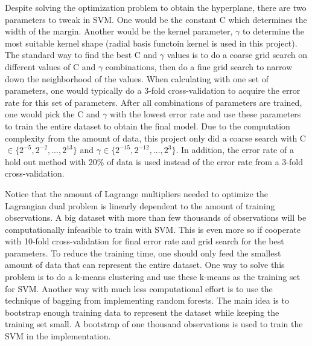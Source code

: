 \documentclass[twoside]{article}
\begin{document}
Despite solving the optimization problem to obtain the hyperplane, there are two parameters to tweak in SVM. One would be the constant C which determines the width of the margin. Another would be the kernel parameter, $\gamma$ to determine the most suitable kernel shape (radial basis functoin kernel is used in this project). The standard way to find the best C and $\gamma$ values is to do a coarse grid search on different values of C and $\gamma$ combinations, then do a fine grid search to narrow down the neighborhood of the values. When calculating with one set of parameters, one would typically do a 3-fold cross-validation to acquire the error rate for this set of parameters. After all combinations of parameters are trained, one would pick the C and $\gamma$ with the lowest error rate and use these parameters to train the entire dataset to obtain the final model. Due to the computation complexity from the amount of data, this project only did a coarse search with C $\in \{2^{-5},2^{-2},...,2^{13}\}$ and $\gamma \in \{2^{-15}, 2^{-12},...,2^{3}\}$. In addition, the error rate of a hold out method with 20\% of data is used instead of the error rate from a 3-fold cross-validation.

Notice that the amount of Lagrange multipliers needed to optimize the Lagrangian dual problem is linearly dependent to the amount of training observations. A big dataset with more than few thousands of observations will be computationally infeasible to train with SVM. This is even more so if cooperate with 10-fold cross-validation for final error rate and grid search for the best parameters. To reduce the training time, one should only feed the smallest amount of data that can represent the entire dataset. One way to solve this problem is to do a k-means clustering and use these k-means as the training set for SVM. Another way with much less computational effort is to use the technique of bagging from implementing random forests. The main idea is to bootstrap enough training data to represent the dataset while keeping the training set small. A bootstrap of one thousand observations is used to train the SVM in the implementation.
\end{document}
